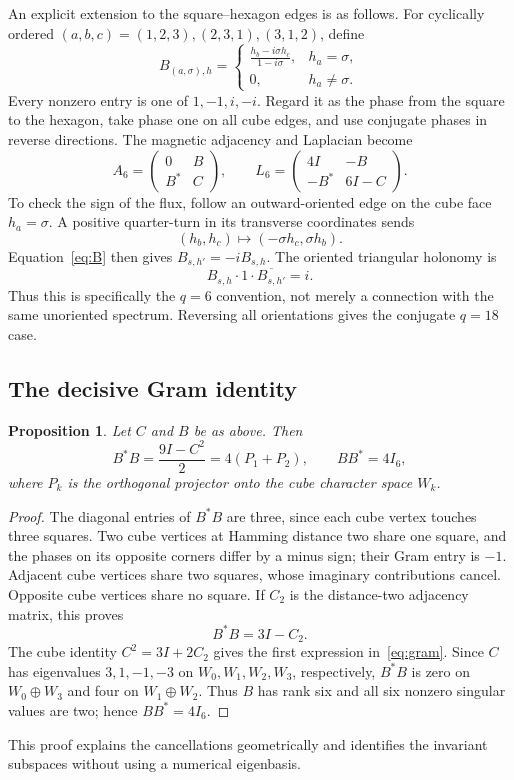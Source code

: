 \documentclass[11pt,a4paper]{article}
\newtheorem{proposition}{Proposition}
\begin{document}
An explicit extension to the square--hexagon edges is as follows. For cyclically ordered $(a,b,c)=(1,2,3),(2,3,1),(3,1,2)$, define
\begin{equation}\label{eq:B}
 B_{(a,\sigma),h}=
 \begin{cases}
 \displaystyle\frac{h_b-i\sigma h_c}{1-i\sigma},&h_a=\sigma,\\[4pt]
 0,&h_a\ne\sigma.
 \end{cases}
\end{equation}
Every nonzero entry is one of $1,-1,i,-i$. Regard it as the phase from the square to the hexagon, take phase one on all cube edges, and use conjugate phases in reverse directions. The magnetic adjacency and Laplacian become
\begin{equation}\label{eq:L6}
 A_6=\begin{pmatrix}0&B\\B^*&C\end{pmatrix},\qquad
 L_6=\begin{pmatrix}4I&-B\\-B^*&6I-C\end{pmatrix}.
\end{equation}
To check the sign of the flux, follow an outward-oriented edge on the cube face $h_a=\sigma$. A positive quarter-turn in its transverse coordinates sends
\[
 (h_b,h_c)\longmapsto(-\sigma h_c,\sigma h_b).
\]
Equation~\eqref{eq:B} then gives $B_{s,h'}=-iB_{s,h}$. The oriented triangular holonomy is
\[
 B_{s,h}\cdot1\cdot\overline{B_{s,h'}}=i.
\]
Thus this is specifically the $q=6$ convention, not merely a connection with the same unoriented spectrum. Reversing all orientations gives the conjugate $q=18$ case.

\subsection{The decisive Gram identity}
\begin{proposition}\label{prop:gram}
Let $C$ and $B$ be as above. Then
\begin{equation}\label{eq:gram}
 B^*B=\frac{9I-C^2}{2}=4(P_1+P_2),\qquad BB^*=4I_6,
\end{equation}
where $P_k$ is the orthogonal projector onto the cube character space $W_k$.
\end{proposition}
\begin{proof}
The diagonal entries of $B^*B$ are three, since each cube vertex touches three squares. Two cube vertices at Hamming distance two share one square, and the phases on its opposite corners differ by a minus sign; their Gram entry is $-1$. Adjacent cube vertices share two squares, whose imaginary contributions cancel. Opposite cube vertices share no square. If $C_2$ is the distance-two adjacency matrix, this proves
\[
 B^*B=3I-C_2.
\]
The cube identity $C^2=3I+2C_2$ gives the first expression in~\eqref{eq:gram}. Since $C$ has eigenvalues $3,1,-1,-3$ on $W_0,W_1,W_2,W_3$, respectively, $B^*B$ is zero on $W_0\oplus W_3$ and four on $W_1\oplus W_2$. Thus $B$ has rank six and all six nonzero singular values are two; hence $BB^*=4I_6$.
\end{proof}
This proof explains the cancellations geometrically and identifies the invariant subspaces without using a numerical eigenbasis.
\end{document}
